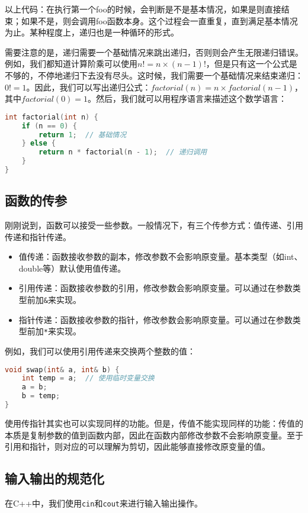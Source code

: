 \documentclass[../main.tex]{subfiles}
\begin{document}
以上代码：在执行第一个foo的时候，会判断是不是基本情况，如果是则直接结束；如果不是，则会调用foo函数本身。这个过程会一直重复，直到满足基本情况为止。某种程度上，递归也是一种循环的形式。

需要注意的是，递归需要一个基础情况来跳出递归，否则则会产生无限递归错误。例如，我们都知道计算阶乘可以使用$n!=n\times(n-1)!$，但是只有这一个公式是不够的，不停地递归下去没有尽头。这时候，我们需要一个基础情况来结束递归：$0!=1$。因此，我们可以写出递归公式：$factorial(n) = n \times factorial(n-1)$，其中$factorial(0) = 1$。然后，我们就可以用程序语言来描述这个数学语言：
\begin{lstlisting}[language=C++]
int factorial(int n) {
    if (n == 0) {
        return 1;  // 基础情况
    } else {
        return n * factorial(n - 1);  // 递归调用
    }
}
\end{lstlisting}

\subsection{函数的传参}

刚刚说到，函数可以接受一些参数。一般情况下，有三个传参方式：值传递、引用传递和指针传递。
\begin{itemize}
  \item 值传递：函数接收参数的副本，修改参数不会影响原变量。基本类型（如int、double等）默认使用值传递。
  \item 引用传递：函数接收参数的引用，修改参数会影响原变量。可以通过在参数类型前加\texttt{\&}来实现。
  \item 指针传递：函数接收参数的指针，修改参数会影响原变量。可以通过在参数类型前加\texttt{*}来实现。
\end{itemize}
例如，我们可以使用引用传递来交换两个整数的值：
\begin{lstlisting}[language=C++]
void swap(int& a, int& b) {
    int temp = a;  // 使用临时变量交换
    a = b;
    b = temp;
}
\end{lstlisting}
使用传指针其实也可以实现同样的功能。但是，传值不能实现同样的功能：传值的本质是复制参数的值到函数内部，因此在函数内部修改参数不会影响原变量。至于引用和指针，则对应的可以理解为剪切，因此能够直接修改原变量的值。

\subsection{输入输出的规范化}

在C++中，我们使用\texttt{cin}和\texttt{cout}来进行输入输出操作。
\end{document}
